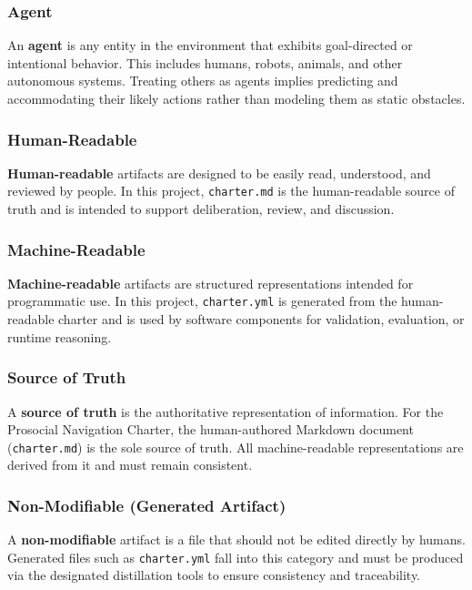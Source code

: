 \documentclass[utf8]{frontiers_suppmat} %
\begin{document}
\subsubsection{Agent}\label{agent}

An \textbf{agent} is any entity in the environment that exhibits
goal-directed or intentional behavior. This includes humans, robots,
animals, and other autonomous systems. Treating others as agents implies
predicting and accommodating their likely actions rather than modeling
them as static obstacles.

\subsubsection{Human-Readable}\label{human-readable}

\textbf{Human-readable} artifacts are designed to be easily read,
understood, and reviewed by people. In this project,
\texttt{charter.md} is the human-readable source of
truth and is intended to support deliberation, review, and discussion.

\subsubsection{Machine-Readable}\label{machine-readable}

\textbf{Machine-readable} artifacts are structured representations
intended for programmatic use. In this project,
\texttt{charter.yml} is generated from the
human-readable charter and is used by software components for
validation, evaluation, or runtime reasoning.

\subsubsection{Source of Truth}\label{source-of-truth}

A \textbf{source of truth} is the authoritative representation of
information. For the Prosocial Navigation Charter, the human-authored
Markdown document (\texttt{charter.md}) is the sole
source of truth. All machine-readable representations are derived from
it and must remain consistent.

\subsubsection{Non-Modifiable (Generated
Artifact)}\label{non-modifiable-generated-artifact}

A \textbf{non-modifiable} artifact is a file that should not be edited
directly by humans. Generated files such as
\texttt{charter.yml} fall into this category and must
be produced via the designated distillation tools to ensure consistency
and traceability.
\end{document}
